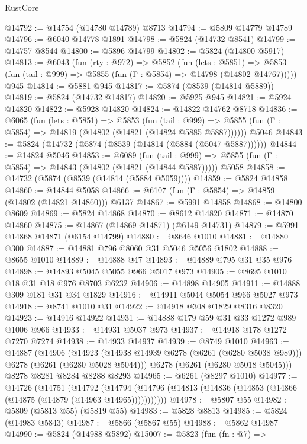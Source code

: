 \begin{lexlean}{RustCore}
\begin{coremodule}
@14792 := @14754 (@14780 @14789) @8713
@14794 := @5809 @14779 @14789
@14796 := @6040 @14778 @1891
@14798 := @5824 (@14732 @8541)
@14799 := @14757 @8544
@14800 := @5896 @14799
@14802 := @5824 (@14800 @5917)
@14813 := @6043
    (fun (rty : @972) =>
    @5852
      (fun (lets : @5851) =>
      @5853 (fun (tail : @999) => @5855 (fun (Γ : @5854) => @14798 (@14802 @14767)))))
    @945
@14814 := @5881 @945
@14817 := @5874 (@8539 (@14814 @5889))
@14819 := @5824 (@14732 @14817)
@14820 := @5925 @945
@14821 := @5924 @14820
@14822 := @5928 @14820
@14824 := @14822 @14762 @8718
@14836 := @6065
    (fun (lets : @5851) =>
    @5853
      (fun (tail : @999) =>
      @5855 (fun (Γ : @5854) => @14819 (@14802 (@14821 (@14824 @5885 @5887))))))
    @5046
@14843 := @5824 (@14732 (@5874 (@8539 (@14814 (@5884 (@5047 @5887))))))
@14844 := @14824 @5046
@14853 := @6089
    (fun (tail : @999) => @5855 (fun (Γ : @5854) => @14843 (@14802 (@14821 (@14844 @5887)))))
    @5058
@14858 := @14732 (@5874 (@8539 (@14814 (@5884 @5059))))
@14859 := @5824 @14858
@14860 := @14844 @5058
@14866 := @6107 (fun (Γ : @5854) => @14859 (@14802 (@14821 @14860))) @6137
@14867 := @5991 @14858
@14868 := @14800 @8609
@14869 := @5824 @14868
@14870 := @8612 @14820
@14871 := @14870 @14860
@14875 := @14867 (@14869 @14871) (@6149 @14731)
@14879 := @5991 @14868 @14871 (@6154 @14799)
@14880 := @8646 @1010
@14881 := @14880 @300
@14887 := @14881 @796 @8060 @31 @5046 @5056 @1802
@14888 := @8655 @1010
@14889 := @14888 @47
@14893 := @14889 @795 @31 @35 @976
@14898 := @14893 @5045 @5055 @966 @5017 @973
@14905 := @8695 @1010 @18 @31 @18 @976 @8703 @6232
@14906 := @14898 @14905
@14911 := @14888 @309 @181 @31 @34 @1829
@14916 := @14911 @5044 @5054 @966 @5027 @973
@14918 := @8741 @1010 @31
@14922 := @14918 @308 @1829 @8316 @8320
@14923 := @14916 @14922
@14931 := @14888 @179 @59 @31 @33 @1272 @989 @1006 @966
@14933 := @14931 @5037 @973
@14937 := @14918 @178 @1272 @7270 @7274
@14938 := @14933 @14937
@14939 := @8749 @1010
@14963 := @14887
    (@14906
      (@14923 (@14938 @14939 @6278 (@6261 (@6280 @5038 @989))) @6278 (@6261 (@6280 @5028 @5044)))
      @6278
      (@6261 (@6280 @5018 @5045)))
    @8278
    @8281
    @8284
    @8288
    @8293
@14965 := @6261 (@8297 @1010)
@14977 := @14726
    (@14751
      (@14792
        (@14794 (@14796 (@14813 (@14836 (@14853 (@14866 (@14875 (@14879 (@14963 @14965)))))))))))
@14978 := @5807 @55
@14982 := @5809 (@5813 @55) (@5819 @55)
@14983 := @5828 @8813
@14985 := @5824 (@14983 @5843)
@14987 := @5866 (@5867 @55)
@14988 := @5862 @14987
@14990 := @5824 (@14988 @5892)
@15007 := @5823
    (fun (fn : @7) =>

\end{coremodule}
\end{lexlean}
